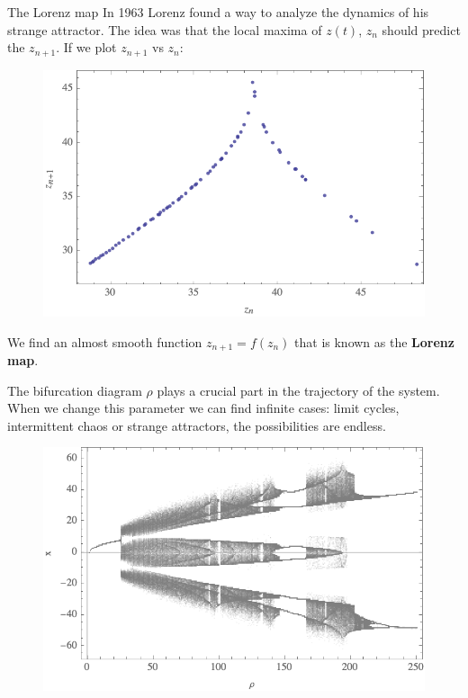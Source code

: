 \documentclass[hyperref={pdfpagelabels=false}]{beamer}
\begin{document}
\begin{frame}{The Lorenz map}
In 1963 Lorenz found a way to analyze the dynamics of his strange attractor. The idea was that the local maxima of $z(t)$, $z_{n}$ should predict the $z_{n+1}$. If we plot $z_{n+1}$ vs $z_{n}$:

\begin{figure}

\includegraphics[width=0.6\linewidth]{Figures/mapeo.png}

\end{figure}

\vspace{-10pt}

We find an almost smooth function $z_{n+1}=f(z_{n})$ that is known as the \textbf{Lorenz map}.
\end{frame}

\begin{frame}{The bifurcation diagram}
$\rho$ plays a crucial part in the trajectory of the system. When we change this parameter we can find infinite cases: limit cycles, intermittent chaos or strange attractors, the possibilities are endless.

\begin{figure}

\includegraphics[width=0.8\linewidth]{Figures/x.png}

\end{figure}


\end{frame}
\end{document}
